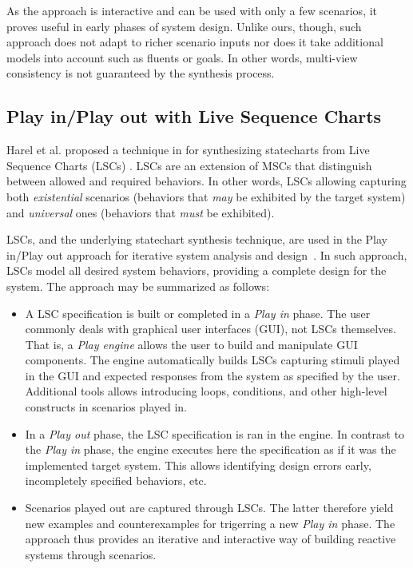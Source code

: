 As the approach is interactive and can be used with only a few scenarios, it proves useful in early phases of system design. Unlike ours, though, such approach does not adapt to richer scenario inputs nor does it take additional models into account such as fluents or goals. In other words, multi-view consistency is not guaranteed by the synthesis process.


\subsection{Play in/Play out with Live Sequence Charts}

Harel et al. proposed a technique in \cite{Harel:2005} for synthesizing statecharts from Live Sequence Charts (LSCs) \cite{Damm:2001}. LSCs are an extension of MSCs that distinguish between allowed and required behaviors. In other words, LSCs allowing capturing both \emph{existential} scenarios (behaviors that \emph{may} be exhibited by the target system) and \emph{universal} ones (behaviors that \emph{must} be exhibited). 

LSCs, and the underlying statechart synthesis technique, are used in the Play in/Play out approach for iterative system analysis and design~\cite{Harel:2003, Harel:2003b}. In such approach, LSCs model all desired system behaviors, providing a complete design for the system. The approach may be summarized as follows:
\begin{itemize}
\item A LSC specification is built or completed in a \emph{Play in} phase. The user commonly deals with graphical user interfaces (GUI), not LSCs themselves. That is, a \emph{Play engine} allows the user to build and manipulate GUI components. The engine automatically builds LSCs capturing stimuli played in the GUI and expected responses from the system as specified by the user. Additional tools allows introducing loops, conditions, and other high-level constructs in scenarios played in.
\item In a \emph{Play out} phase, the LSC specification is ran in the engine. In contrast to the \emph{Play in} phase, the engine executes here the specification as if it was the implemented target system. This allows identifying design errors early, incompletely specified behaviors, etc. 
\item Scenarios played out are captured through LSCs. The latter therefore yield new examples and counterexamples for trigerring a new \emph{Play in} phase. The approach thus provides an iterative and interactive way of building reactive systems through scenarios.
\end{itemize}

